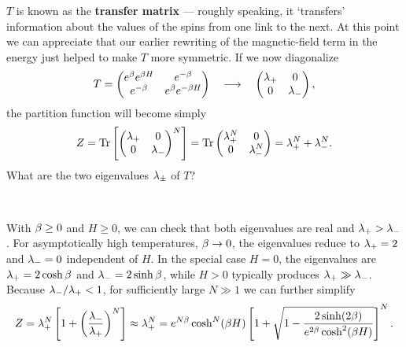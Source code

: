 $T$ is known as the \textbf{transfer matrix} --- roughly speaking, it `transfers' information about the values of the spins from one link to the next.
At this point we can appreciate that our earlier rewriting of the magnetic-field term in the energy just helped to make $T$ more symmetric.
If we now diagonalize
\begin{equation*}
  T = \begin{pmatrix} e^{\beta} e^{\beta H} & e^{-\beta} \\ e^{-\beta} & e^{\beta} e^{-\beta H} \end{pmatrix} \quad \longrightarrow \quad \begin{pmatrix} \lambda_+ & 0 \\ 0 & \lambda_- \end{pmatrix},
\end{equation*}
the partition function will become simply
\begin{equation*}
  Z = \mbox{Tr}\left[\begin{pmatrix} \lambda_+ & 0 \\ 0 & \lambda_- \end{pmatrix}^N\right] = \mbox{Tr}\begin{pmatrix} \lambda_+^N & 0 \\ 0 & \lambda_-^N \end{pmatrix} = \lambda_+^N + \lambda_-^N.
\end{equation*}
\newpage %
\noindent What are the two eigenvalues $\lambda_{\pm}$ of $T$?
\begin{mdframed}
  \ \\[100 pt]
\end{mdframed}

With $\beta \geq 0$ and $H \geq 0$, we can check that both eigenvalues are real and $\lambda_+ > \lambda_-$.
For asymptotically high temperatures, $\beta \to 0$, the eigenvalues reduce to $\lambda_+ = 2$ and $\lambda_- = 0$ independent of $H$.
In the special case $H = 0$, the eigenvalues are $\lambda_+ = 2\cosh\beta$ and $\lambda_- = 2\sinh\beta$, while $H > 0$ typically produces $\lambda_+ \gg \lambda_-$.
Because $\lambda_- / \lambda_+ < 1$, for sufficiently large $N \gg 1$ we can further simplify
\begin{equation*}
  Z = \lambda_+^N\left[1 + \left(\frac{\lambda_-}{\lambda_+}\right)^N \right] \approx \lambda_+^N = e^{N\beta} \cosh^N(\beta H)\left[1 + \sqrt{1 - \frac{2\sinh(2\beta)}{e^{2\beta}\cosh^2(\beta H)}}\right]^N.
\end{equation*}

